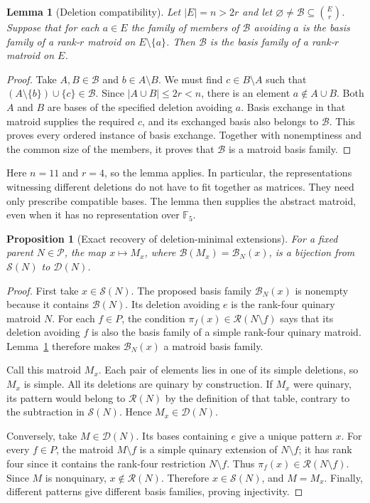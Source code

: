 \documentclass[11pt,a4paper]{article}
\newtheorem{lemma}[theorem]{Lemma}
\newtheorem{proposition}[theorem]{Proposition}
\theoremstyle{definition}
\newcommand{\F}{\mathbb F_5}
\newcommand{\B}{\mathcal B}
\newcommand{\RR}{\mathcal R}
\begin{document}
\begin{lemma}[Deletion compatibility]\label{lem:deletion}
Let $|E|=n>2r$ and let $\varnothing\ne\B\subseteq\binom Er$.
Suppose that for each $a\in E$ the family of members of $\B$ avoiding
$a$ is the basis family of a rank-$r$ matroid on $E\setminus\{a\}$.
Then $\B$ is the basis family of a rank-$r$ matroid on $E$.
\end{lemma}
\begin{proof}
Take $A,B\in\B$ and $b\in A\setminus B$. We must find
$c\in B\setminus A$ such that
$(A\setminus\{b\})\cup\{c\}\in\B$. Since
$|A\cup B|\leq2r<n$, there is an element $a\notin A\cup B$.
Both $A$ and $B$ are bases of the specified deletion avoiding $a$.
Basis exchange in that matroid supplies the required $c$, and its
exchanged basis also belongs to $\B$. This proves every ordered
instance of basis exchange. Together with nonemptiness and the
common size of the members, it proves that $\B$ is a matroid basis
family.
\end{proof}

Here $n=11$ and $r=4$, so the lemma applies. In particular, the
representations witnessing different deletions do not have to fit
together as matrices. They need only prescribe compatible bases.
The lemma then supplies the abstract matroid, even when it has no
representation over $\F$.

\begin{proposition}[Exact recovery of deletion-minimal extensions]\label{prop:local}
For a fixed parent $N\in\mathcal P$, the map
$x\mapsto M_x$, where $\B(M_x)=\B_N(x)$, is a bijection from
$\mathcal S(N)$ to $\mathcal D(N)$.
\end{proposition}
\begin{proof}
First take $x\in\mathcal S(N)$. The proposed basis family
$\B_N(x)$ is nonempty because it contains $\B(N)$. Its deletion
avoiding $e$ is the rank-four quinary matroid $N$. For each $f\in P$,
the condition $\pi_f(x)\in\RR(N\setminus f)$ says that its deletion
avoiding $f$ is also the basis family of a simple rank-four quinary
matroid. Lemma~\ref{lem:deletion} therefore makes $\B_N(x)$ a
matroid basis family.

Call this matroid $M_x$. Each pair of elements lies in one of its
simple deletions, so $M_x$ is simple. All its deletions are quinary
by construction. If $M_x$ were quinary, its pattern would belong
to $\RR(N)$ by the definition of that table, contrary to the
subtraction in $\mathcal S(N)$. Hence $M_x\in\mathcal D(N)$.

Conversely, take $M\in\mathcal D(N)$. Its bases containing $e$
give a unique pattern $x$. For every $f\in P$, the matroid
$M\setminus f$ is a simple quinary extension of $N\setminus f$;
it has rank four since it contains the rank-four restriction
$N\setminus f$. Thus $\pi_f(x)\in\RR(N\setminus f)$. Since
$M$ is nonquinary, $x\notin\RR(N)$. Therefore
$x\in\mathcal S(N)$, and $M=M_x$. Finally, different patterns
give different basis families, proving injectivity.
\end{proof}
\end{document}
